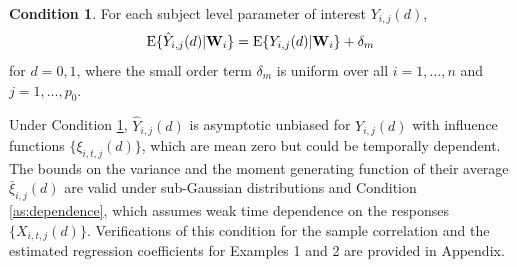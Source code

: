 \documentclass[12pt]{article}
\theoremstyle{definition}
\newtheorem{as}{Condition}
\newcommand{\E}{\rm E}
\newcommand{\V}{\rm Var}
\newcommand{\bW}{{\mathbf W}}
\newcommand{\bY}{{\mathbf Y}}
\begin{document}
\fi
%
%
%
\iffalse
\begin{as}
For each subject level parameter of interest $Y_{i, j}(d)$, $${\E}\{\hat{Y}_{i,j}(d) | \bW_i\} = {\E}\{Y_{i,j}(d) | \bW_i\} + \delta_m$$ for $d = 0, 1$, where the small order term $\delta_m$ is uniform over all $i = 1, \ldots, n$ and $j = 1, \ldots, p_0$.
\label{as:est}\end{as}


Under Condition \ref{as:est}, $\hat{Y}_{i,j}(d)$ is asymptotic unbiased for $Y_{i,j}(d)$ with influence functions $\{\xi_{i, t, j}(d)\}$, which are mean zero but could be temporally dependent. The bounds on the variance and the moment generating function of their average $\bar{\xi}_{i,j}(d)$ are valid under sub-Gaussian distributions and Condition \ref{as:dependence}, which assumes weak time dependence on the responses $\{X_{i, t, j}(d)\}$. 
Verifications of this condition for the sample correlation and the estimated regression coefficients for Examples 1 and 2 are provided in Appendix.
\end{document}

